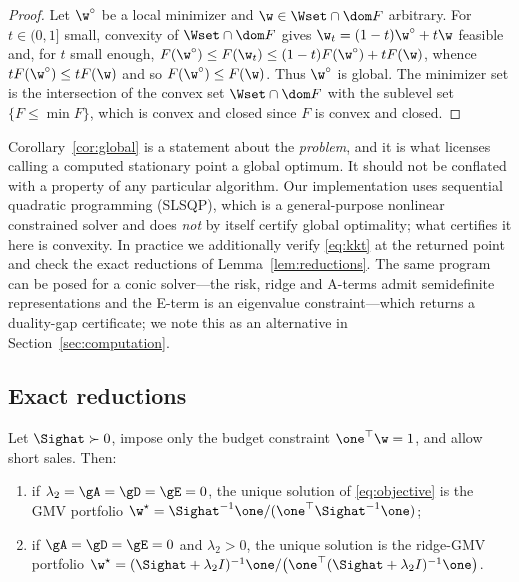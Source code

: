 \begin{proof}
Let $\w^{\circ}$ be a local minimizer and $\w\in\Wset\cap\dom F$ arbitrary. For
$t\in(0,1]$ small, convexity of $\Wset\cap\dom F$ gives
$\w_t=(1-t)\w^{\circ}+t\w$ feasible and, for $t$ small enough,
$F(\w^{\circ})\le F(\w_t)\le(1-t)F(\w^{\circ})+tF(\w)$, whence
$tF(\w^{\circ})\le tF(\w)$ and so $F(\w^{\circ})\le F(\w)$. Thus $\w^{\circ}$ is
global. The minimizer set is the intersection of the convex set
$\Wset\cap\dom F$ with the sublevel set $\{F\le\min F\}$, which is convex and
closed since $F$ is convex and closed.
\end{proof}

\begin{remark}
\label{rem:solver}
Corollary~\ref{cor:global} is a statement about the \emph{problem}, and it is
what licenses calling a computed stationary point a global optimum. It should not
be conflated with a property of any particular algorithm. Our implementation uses
sequential quadratic programming (SLSQP), which is a general-purpose nonlinear
constrained solver and does \emph{not} by itself certify global optimality; what
certifies it here is convexity. In practice we additionally verify
\eqref{eq:kkt} at the returned point and check the exact reductions of
Lemma~\ref{lem:reductions}. The same program can be posed for a conic solver---the
risk, ridge and A-terms admit semidefinite representations and the E-term is an
eigenvalue constraint---which returns a duality-gap certificate; we note this as
an alternative in Section~\ref{sec:computation}.
\end{remark}

\subsection{Exact reductions}

\begin{lemma}[Reductions]
\label{lem:reductions}
Let $\Sighat\succ0$, impose only the budget constraint $\one^\top\w=1$, and allow
short sales. Then:
\begin{enumerate}[label=(\roman*),leftmargin=2.0em,itemsep=0.15em]
  \item if $\lambda_2=\gA=\gD=\gE=0$, the unique solution of
    \eqref{eq:objective} is the GMV portfolio
    $\w^\star=\Sighat^{-1}\one/(\one^\top\Sighat^{-1}\one)$;
  \item if $\gA=\gD=\gE=0$ and $\lambda_2>0$, the unique solution is the
    ridge-GMV portfolio
    $\w^\star=(\Sighat+\lambda_2I)^{-1}\one/\big(\one^\top(\Sighat+\lambda_2I)^{-1}\one\big)$.
\end{enumerate}
\end{lemma}

